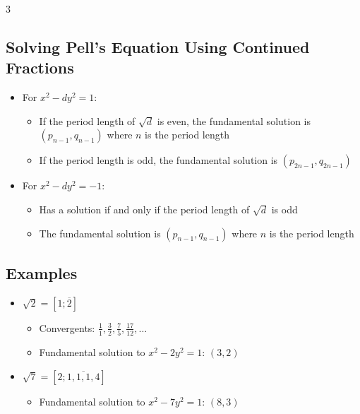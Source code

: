 \documentclass[8,a4paper]{article}
\begin{document}
\begin{multicols}{3}
	\subsection{Solving Pell's Equation Using Continued Fractions}
	\begin{itemize}[leftmargin=*]
		\item For $x^2 - dy^2 = 1$:
		      \begin{itemize}
			      \item If the period length of $\sqrt{d}$ is even, the fundamental solution is $(p_{n-1}, q_{n-1})$ where $n$ is the period length
			      \item If the period length is odd, the fundamental solution is $(p_{2n-1}, q_{2n-1})$
		      \end{itemize}
		\item For $x^2 - dy^2 = -1$:
		      \begin{itemize}
			      \item Has a solution if and only if the period length of $\sqrt{d}$ is odd
			      \item The fundamental solution is $(p_{n-1}, q_{n-1})$ where $n$ is the period length
		      \end{itemize}
	\end{itemize}

	\subsection{Examples}
	\begin{itemize}[leftmargin=*]
		\item $\sqrt{2} = [1; \overline{2}]$
		      \begin{itemize}
			      \item Convergents: $\frac{1}{1}, \frac{3}{2}, \frac{7}{5}, \frac{17}{12}, \ldots$
			      \item Fundamental solution to $x^2 - 2y^2 = 1$: $(3, 2)$
		      \end{itemize}
		\item $\sqrt{7} = [2; \overline{1, 1, 1, 4}]$
		      \begin{itemize}
			      \item Fundamental solution to $x^2 - 7y^2 = 1$: $(8, 3)$
		      \end{itemize}
	\end{itemize}

\end{multicols}
\end{document}
